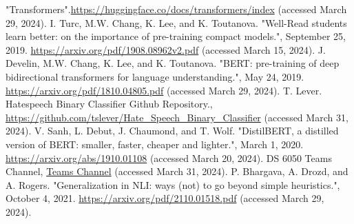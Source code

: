 \documentclass[conference]{IEEEtran}
\begin{document}
\begin{thebibliography}{00}
 "Transformers".\href{https://huggingface.co/docs/transformers/index}{https://huggingface.co/docs/transformers/index} (accessed March 29, 2024).
 I. Turc, M.W. Chang, K. Lee, and K. Toutanova. "Well-Read students learn better: on the importance of pre-training compact models.", September 25, 2019. \href{https://arxiv.org/pdf/1908.08962v2.pdf}{https://arxiv.org/pdf/1908.08962v2.pdf} (accessed March 15, 2024).
 J. Develin, M.W. Chang, K. Lee, and K. Toutanova. "BERT: pre-training of deep bidirectional transformers for language understanding.", May 24, 2019. \href{https://arxiv.org/pdf/1810.04805.pdf}{https://arxiv.org/pdf/1810.04805.pdf} (accessed March 29, 2024).
 T. Lever. Hatespeech Binary Classifier Github Repository., \href{https://github.com/tslever/Hate_Speech_Binary_Classifier}{https://github.com/tslever/Hate_Speech_Binary_Classifier} (accessed March 31, 2024).
V. Sanh, L. Debut, J. Chaumond, and T. Wolf. "DistilBERT, a distilled version of BERT: smaller, faster, cheaper and lighter.", March 1, 2020. \href{https://arxiv.org/abs/1910.01108}{https://arxiv.org/abs/1910.01108} (accessed March 20, 2024). 
 DS 6050 Teams Channel, \href{https://myuva.sharepoint.com/:f:/s/DeepLearningProject197/EhqdcbyWnR1NmhQ6Ncn4oREBEb3JMQX6_L0OdURiePC_Vg?e=zbRngc}{Teams Channel} (accessed March 31, 2024).
 P. Bhargava, A. Drozd, and A. Rogers. "Generalization in NLI: ways (not) to go beyond simple heuristics.", October 4, 2021. \href{https://arxiv.org/pdf/2110.01518.pdf}{https://arxiv.org/pdf/2110.01518.pdf} (accessed March 29, 2024). 

\end{thebibliography}
\end{document}
